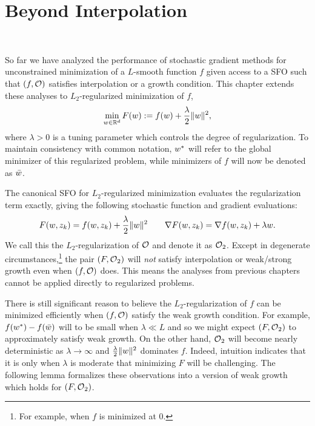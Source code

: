 
\chapter{Beyond Interpolation}~\label{ch:beyond-interpolation}

So far we have analyzed the performance of stochastic gradient methods for unconstrained minimization of a \( L \)-smooth function \( f \) given access to a SFO \oracle{} such that \( \rbr{f, \oracle{}} \) satisfies interpolation or a growth condition. 
This chapter extends these analyses to \( L_2 \)-regularized minimization of \( f \), 
\[ \min_{\w \in \R^d} F(\w) := f(\w) + \frac{\lambda}{2} \norm{\w}^2, \]
where \( \lambda > 0 \) is a tuning parameter which controls the degree of regularization. 
To maintain consistency with common notation, \( \wopt \) will refer to the global minimizer of this regularized problem, while minimizers of \( f \) will now be denoted as \( \wbar \).

The canonical SFO for \( L_2 \)-regularized minimization evaluates the regularization term exactly, giving the following stochastic function and gradient evaluations: 
\[ F(\w, \zk) = f(\w, \zk) + \frac{\lambda}{2} \norm{\w}^2 \quad \quad \nabla F(\w, \zk) = \grad(\w, \zk) + \lambda \w.  \]
We call this the \( L_2 \)-regularization of \( \oracle{} \) and denote it as \( \oracle{}_2 \).
Except in degenerate circumstances,\footnote{For example, when \( f \) is minimized at \( 0 \).} the pair \( \rbr{F, \oracle{}_2} \) will \emph{not} satisfy interpolation or weak/strong growth even when \( \rbr{f, \oracle{}} \) does. 
This means the analyses from previous chapters cannot be applied directly to regularized problems.

There is still significant reason to believe the \( L_2 \)-regularization of \( f \) can be minimized efficiently when \( \rbr{f, \oracle{}} \) satisfy the weak growth condition.
For example, \( f(\wopt) - f(\wbar) \) will to be small when \( \lambda \ll L \) and so we might expect \( \rbr{F, \oracle{}_2} \) to approximately satisfy weak growth. 
On the other hand, \( \oracle{}_2 \) will become nearly deterministic as \( \lambda \rightarrow \infty \) and \( \frac{\lambda}{2} \norm{\w}^2 \) dominates \( f \).
Indeed, intuition indicates that it is only when \( \lambda \) is moderate that minimizing \( F \) will be challenging.
The following lemma formalizes these observations into a version of weak growth which holds for \( \rbr{F, \oracle{}_2} \).

